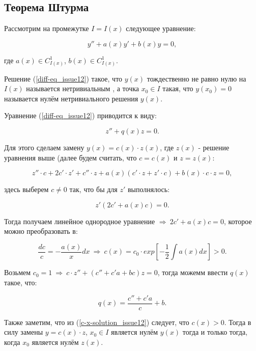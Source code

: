 




\subsection{Теорема Штурма}

Рассмотрим на промежутке $I = I(x)$ следующее уравнение:

\begin{equation}\label{diff-eq_issue12}
y'' + a(x)y' + b(x)y = 0,
\end{equation}

где $a(x) \in C^1_{I(x)}$, $b(x) \in C^1_{I(x)}$.

Решение (\ref{diff-eq_issue12}) такое, что $y(x)$ тождественно не равно нулю на $I(x)$ называется нетривиальным , а точка $x_0 \in I$ такая, что $y(x_0) = 0$ называется нулём нетривиального решения $y(x)$.

Уравнение (\ref{diff-eq_issue12}) приводится к виду:

\begin{equation}\label{diff-eq_z-form_issue12}
z'' + q(x)z = 0.
\end{equation}

Для этого сделаем замену $y(x) = c(x) \cdot z(x)$, где $z(x)$ - решение уравнения выше (далее будем считать, что $c = c(x)$ и $z = z(x)$:

\[z''\cdot c + 2c' \cdot z' + c'' \cdot z + a(x) (c' \cdot z + z' \cdot c) + b(x) \cdot c \cdot z = 0,\]

здесь выберем $c \neq 0$ так, что бы для $z'$ выполнялось:

\[z' (2c' + a(x) c) = 0.\]

Тогда получаем линейное однородное уравнение $\Rightarrow \: 2c' + a(x)c = 0$, которое можно преобразовать в:

\begin{equation}\label{c-x-solution_issue12}
\frac{dc}{c} = - \frac{a(x)}{x}dx\: \Rightarrow \: c(x) = c_0 \cdot exp \left[-\frac{1}{2} \int a(x)dx\right] > 0.
\end{equation}

Возьмем $c_0 = 1 \: \Rightarrow \: c \cdot z'' + (c'' + c'a + bc)z = 0$, тогда можемм ввести $q(x)$ такое, что:

\[q(x) = \frac{c'' + c'a}{c} + b.\]

Также заметим, что из (\ref{c-x-solution_issue12}) следует, что $c(x) > 0$. Тогда в силу замены $y = c(x) \cdot z$, $x_0 \in I$ является нулём $y(x)$ тогда и только тогда, когда $x_0$ является нулём $z(x)$.

